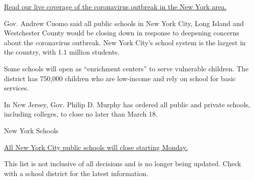 \href{https://www.nytimes3xbfgragh.onion/2020/03/12/nyregion/coronavirus-new-york-update.html?action=click\&module=RelatedLinks\&pgtype=Article}{Read
our live coverage of the coronavirus outbreak in the New York area.}

Gov. Andrew Cuomo said all public schools in New York City, Long Island
and Westchester County would be closing down in response to deepening
concerns about the coronavirus outbreak. New York City's school system
is the largest in the country, with 1.1 million students.

Some schools will open as ``enrichment centers'' to serve vulnerable
children. The district has 750,000 children who are low-income and rely
on school for basic services.

In New Jersey, Gov. Philip D. Murphy has ordered all public and private
schools, including colleges, to close no later than March 18.

New York Schools

\href{https://www.nytimes3xbfgragh.onion/2020/03/15/nyregion/coronavirus-schools-close-nyc.html?action=click\&module=RelatedLinks\&pgtype=Article}{All
New York City public schools will close starting Monday.}

This list is not inclusive of all decisions and is no longer being
updated. Check with a school district for the latest information.

